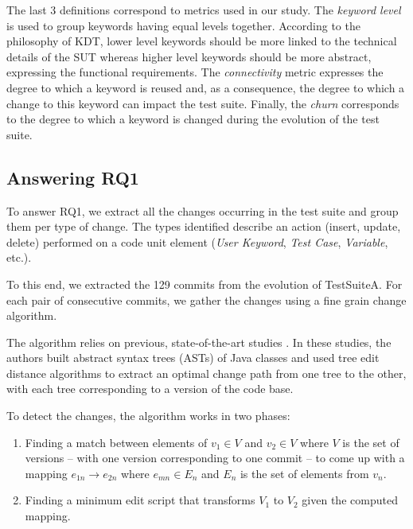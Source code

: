 The last 3 definitions correspond to metrics used in our study. The \emph{keyword level} is used to group keywords having equal levels together. According to the philosophy of KDT, lower level keywords should be more linked to the technical details of the SUT whereas higher level keywords should be more abstract, expressing the functional requirements. The \emph{ connectivity} metric expresses the degree to which a keyword is reused and, as a consequence, the degree to which a change to this keyword can impact the test suite. Finally, the \emph{churn} corresponds to the degree to which a keyword is changed during the evolution of the test suite.

\subsection{Answering RQ1}
\label{sec:evolution-protocol-rq1}

To answer RQ1, we extract all the changes occurring in the test suite and group them per type of change. The types identified describe an action (insert, update, delete) performed on a code unit element (\emph{User Keyword}, \emph{Test Case}, \emph{Variable}, etc.). 

To this end, we extracted the 129 commits from the evolution of TestSuiteA. For each pair of consecutive commits, we gather the changes using a fine grain change algorithm.

The algorithm relies on previous, state-of-the-art studies \cite{Chawathe1996, Falleri2014, Fluri2007, Pinto2012}. In these studies, the authors built abstract syntax trees (ASTs) of Java classes and used tree edit distance algorithms to extract an optimal change path from one tree to the other, with each tree corresponding to a version of the code base.

To detect the changes, the algorithm works in two phases:

\begin{enumerate}
    \item Finding a match between elements of $v_1 \in V$ and $v_2 \in V$ where $V$ is the set of versions -- with one version corresponding to one commit -- to come up with a mapping $e_{1n} \rightarrow e_{2n}$ where $e_{mn} \in E_n$ and $E_n$ is the set of elements from $v_n$.
  
    \item Finding a minimum edit script that transforms $V_1$ to $V_2$ given the computed mapping.
\end{enumerate}

